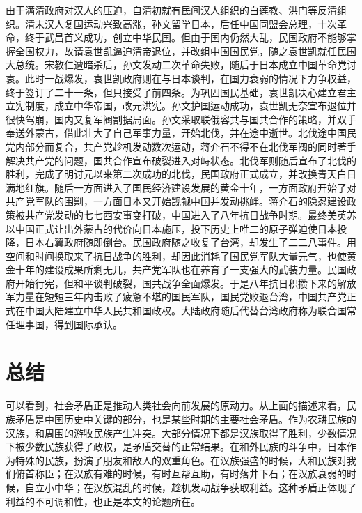 由于满清政府对汉人的压迫，自清初就有民间汉人组织的白莲教、洪门等反清组织。清末汉人复国运动兴致高涨，孙文留学日本，后任中国同盟会总理，十次革命，终于武昌首义成功，创立中华民国。但由于国内仍然大乱，民国政府不能够掌握全国权力，故请袁世凯逼迫清帝退位，并改组中国国民党，随之袁世凯就任民国大总统。宋教仁遭暗杀后，孙文发动二次革命失败，随后于日本成立中国革命党讨袁。此时一战爆发，袁世凯政府则在与日本谈判，在国力衰弱的情况下力争权益，终于签订了二十一条，但只接受了前四条。为巩固国民基础，袁世凯决心建立君主立宪制度，成立中华帝国，改元洪宪。孙文护国运动成功，袁世凯无奈宣布退位并很快驾崩，国内又复军阀割据局面。孙文采取联俄容共与国共合作的策略，并双手奉送外蒙古，借此壮大了自己军事力量，开始北伐，并在途中逝世。北伐途中国民党内部分而复合，共产党趁机发动数次运动，蒋介石不得不在北伐军阀的同时著手解决共产党的问题，国共合作宣布破裂进入对峙状态。北伐军则随后宣布了北伐的胜利，完成了明讨元以来第二次成功的北伐，民国政府正式成立，并改换青天白日满地红旗。随后一方面进入了国民经济建设发展的黄金十年，一方面政府开始了对共产党军队的围剿，一方面日本又开始觊觎中国并发动挑衅。蒋介石的隐忍建设政策被共产党发动的七七西安事变打破，中国进入了八年抗日战争时期。最终美英苏以中国正式让出外蒙古的代价向日本施压，投下历史上唯二的原子弹迫使日本投降，日本右翼政府随即倒台。民国政府随之收复了台湾，却发生了二二八事件。用空间和时间换取来了抗日战争的胜利，却因此消耗了国民党军队大量元气，也使黄金十年的建设成果所剩无几，共产党军队也在养育了一支强大的武装力量。民国政府开始行宪，但和平谈判破裂，国共战争全面爆发。于是八年抗日积攒下来的解放军力量在短短三年内击败了疲惫不堪的国民军队，国民党败退台湾，中国共产党正式在中国大陆建立中华人民共和国政权。大陆政府随后代替台湾政府称为联合国常任理事国，得到国际承认。

\section{总结}

可以看到，社会矛盾正是推动人类社会向前发展的原动力。从上面的描述来看，民族矛盾是中国历史中关键的部分，也是某些时期的主要社会矛盾。作为农耕民族的汉族，和周围的游牧民族产生冲突。大部分情况下都是汉族取得了胜利，少数情况下被少数民族获得了政权，是矛盾交替的正常结果。在和外民族的斗争中，日本作为特殊的民族，扮演了朋友和敌人的双重角色。在汉族强盛的时候，大和民族对我们俯首称臣；在汉族有难的时候，有时互帮互助，有时落井下石；在汉族衰弱的时候，自立小中华；在汉族混乱的时候，趁机发动战争获取利益。这种矛盾正体现了利益的不可调和性，也正是本文的论题所在。